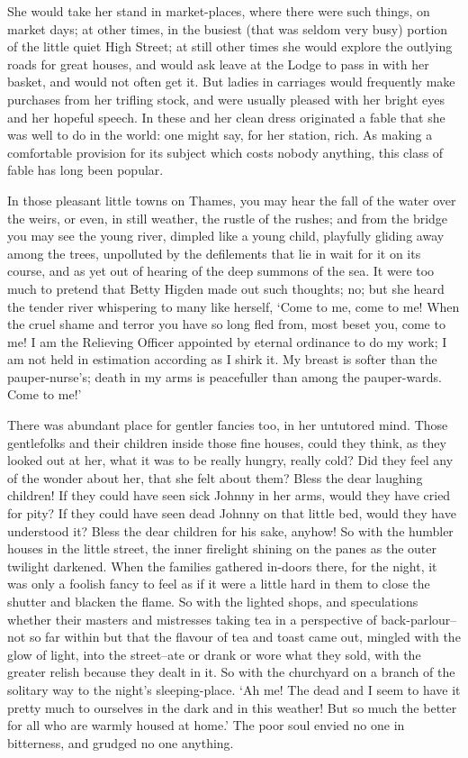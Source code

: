 She would take her stand in market-places, where there were such things,
on market days; at other times, in the busiest (that was seldom very
busy) portion of the little quiet High Street; at still other times she
would explore the outlying roads for great houses, and would ask leave
at the Lodge to pass in with her basket, and would not often get it. But
ladies in carriages would frequently make purchases from her trifling
stock, and were usually pleased with her bright eyes and her hopeful
speech. In these and her clean dress originated a fable that she was
well to do in the world: one might say, for her station, rich. As making
a comfortable provision for its subject which costs nobody anything,
this class of fable has long been popular.

In those pleasant little towns on Thames, you may hear the fall of
the water over the weirs, or even, in still weather, the rustle of the
rushes; and from the bridge you may see the young river, dimpled like a
young child, playfully gliding away among the trees, unpolluted by the
defilements that lie in wait for it on its course, and as yet out of
hearing of the deep summons of the sea. It were too much to pretend that
Betty Higden made out such thoughts; no; but she heard the tender river
whispering to many like herself, ‘Come to me, come to me! When the cruel
shame and terror you have so long fled from, most beset you, come to me!
I am the Relieving Officer appointed by eternal ordinance to do my work;
I am not held in estimation according as I shirk it. My breast is softer
than the pauper-nurse’s; death in my arms is peacefuller than among the
pauper-wards. Come to me!’

There was abundant place for gentler fancies too, in her untutored mind.
Those gentlefolks and their children inside those fine houses, could
they think, as they looked out at her, what it was to be really hungry,
really cold? Did they feel any of the wonder about her, that she felt
about them? Bless the dear laughing children! If they could have seen
sick Johnny in her arms, would they have cried for pity? If they could
have seen dead Johnny on that little bed, would they have understood it?
Bless the dear children for his sake, anyhow! So with the humbler houses
in the little street, the inner firelight shining on the panes as the
outer twilight darkened. When the families gathered in-doors there, for
the night, it was only a foolish fancy to feel as if it were a little
hard in them to close the shutter and blacken the flame. So with the
lighted shops, and speculations whether their masters and mistresses
taking tea in a perspective of back-parlour--not so far within but that
the flavour of tea and toast came out, mingled with the glow of light,
into the street--ate or drank or wore what they sold, with the greater
relish because they dealt in it. So with the churchyard on a branch of
the solitary way to the night’s sleeping-place. ‘Ah me! The dead and
I seem to have it pretty much to ourselves in the dark and in this
weather! But so much the better for all who are warmly housed at home.’
The poor soul envied no one in bitterness, and grudged no one anything.


